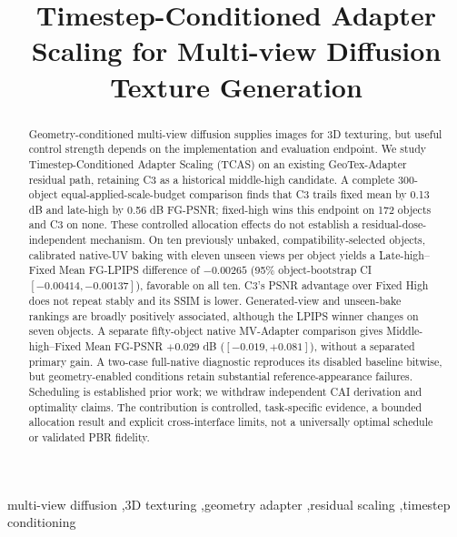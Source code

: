 \documentclass[times,twocolumn,final]{elsarticle}
\begin{document}
\begin{frontmatter}

\title{Timestep-Conditioned Adapter Scaling for Multi-view Diffusion Texture Generation}


\begin{abstract}
Geometry-conditioned multi-view diffusion supplies images for 3D texturing, but useful control strength depends on the implementation and evaluation endpoint. We study Timestep-Conditioned Adapter Scaling (TCAS) on an existing GeoTex-Adapter residual path, retaining C3 as a historical middle-high candidate. A complete 300-object equal-applied-scale-budget comparison finds that C3 trails fixed mean by 0.13 dB and late-high by 0.56 dB FG-PSNR; fixed-high wins this endpoint on 172 objects and C3 on none. These controlled allocation effects do not establish a residual-dose-independent mechanism. On ten previously unbaked, compatibility-selected objects, calibrated native-UV baking with eleven unseen views per object yields a Late-high--Fixed Mean FG-LPIPS difference of $-0.00265$ (95\% object-bootstrap CI $[-0.00414,-0.00137]$), favorable on all ten. C3's PSNR advantage over Fixed High does not repeat stably and its SSIM is lower. Generated-view and unseen-bake rankings are broadly positively associated, although the LPIPS winner changes on seven objects. A separate fifty-object native MV-Adapter comparison gives Middle-high--Fixed Mean FG-PSNR $+0.029$ dB ($[-0.019,+0.081]$), without a separated primary gain. A two-case full-native diagnostic reproduces its disabled baseline bitwise, but geometry-enabled conditions retain substantial reference-appearance failures. Scheduling is established prior work; we withdraw independent CAI derivation and optimality claims. The contribution is controlled, task-specific evidence, a bounded allocation result and explicit cross-interface limits, not a universally optimal schedule or validated PBR fidelity.
\end{abstract}

\begin{keyword}
\KWD
multi-view diffusion \sep 3D texturing \sep geometry adapter \sep residual scaling \sep timestep conditioning
\end{keyword}

\end{frontmatter}
\end{document}
